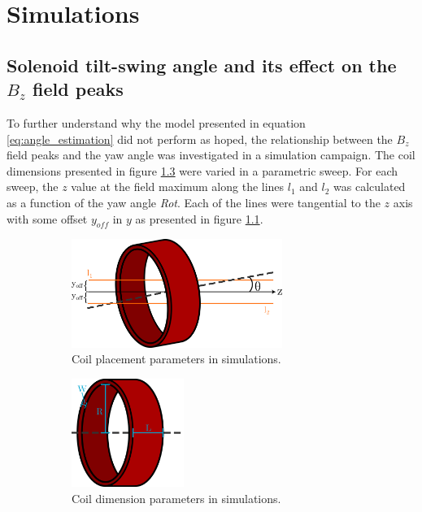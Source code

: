 \chapter{Simulations}

\section{Solenoid tilt-swing angle and its effect on the $B_z$ field peaks}
\label{sec:simulations}

To further understand why the model presented in equation
\ref{eq:angle_estimation} did not perform as hoped, the relationship
between the $B_z$ field peaks and the yaw angle was investigated in
a simulation campaign. The coil dimensions presented in figure
\ref{fig:sim-mag-dims} were varied in a parametric sweep.
For each sweep, the $z$ value at the field maximum along the lines $l_1$ and $l_2$
was calculated as a function of the yaw angle \emph{Rot}. Each
of the lines were tangential to the $z$ axis with some offset
$y_{off}$ in $y$ as presented in figure \ref{fig:sim-mag-rot}.

\begin{figure}[h!]
    \centering
    \begin{subfigure}[b]{0.4\textwidth}
        \centering
        \includegraphics[height=100pt]{figs/sim_mag_rot}
        \caption{Coil placement parameters in simulations.}
        \label{fig:sim-mag-rot}
    \end{subfigure}
    \hfill
    \begin{subfigure}[b]{0.4\textwidth}
        \centering
        \includegraphics[height=100pt]{figs/sim_mag_dims}
        \caption{Coil dimension parameters in simulations.}
        \label{fig:sim-mag-dims}
    \end{subfigure}
    \caption{}
\end{figure}

